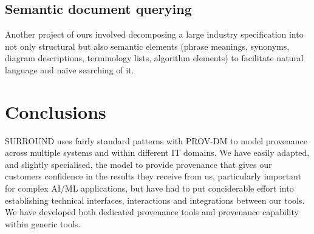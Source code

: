 \documentclass[letterpaper,twocolumn,10pt]{article}
\begin{document}
\subsection{Semantic document querying}
Another project of ours involved decomposing a large industry specification into not only structural but also semantic elements (phrase meanings, synonyms, diagram descriptions, terminology lists, algorithm elements) to facilitate natural language and na\"ive searching of it.

\section{Conclusions}
SURROUND uses fairly standard patterns with PROV-DM to model provenance across multiple systems and within different IT domains.
We have easily adapted, and slightly specialised, the model to provide provenance that gives our customers confidence in the results
they receive from us, particularly important for complex AI/ML applications, but have had to put conciderable effort into establishing
technical interfaces, interactions and integrations between our tools. We have developed both dedicated provenance tools and provenance
capability within generic tools.


% 


\end{document}

